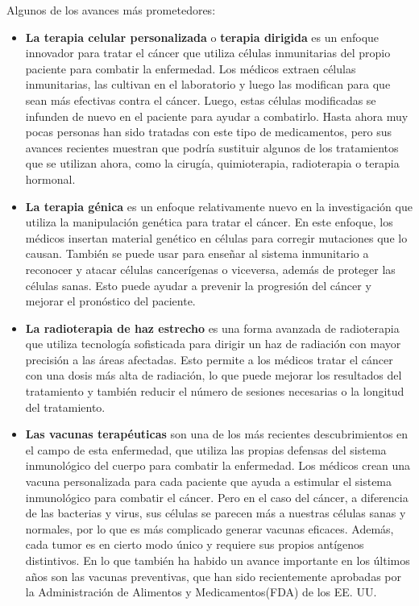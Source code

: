 Algunos de los avances más prometedores:
\begin{itemize}
    \item \textbf{La terapia celular personalizada} o \textbf{terapia dirigida} es un enfoque innovador para tratar el cáncer que utiliza células inmunitarias del propio paciente para combatir la enfermedad. Los médicos extraen células inmunitarias, las cultivan en el laboratorio y luego las modifican para que sean más efectivas contra el cáncer. Luego, estas células modificadas se infunden de nuevo en el paciente para ayudar a combatirlo. Hasta ahora muy pocas personas han sido tratadas con este tipo de medicamentos, pero sus avances recientes muestran que podría sustituir algunos de los tratamientos que se utilizan ahora, como la cirugía, quimioterapia, radioterapia o terapia hormonal.
    \item \textbf{La terapia génica} es un enfoque relativamente nuevo en la investigación que utiliza la manipulación genética para tratar el cáncer. En este enfoque, los médicos insertan material genético en células para corregir mutaciones que lo causan. También se puede usar para enseñar al sistema inmunitario a reconocer y atacar células cancerígenas o viceversa, adem\'as de proteger las células sanas. Esto puede ayudar a prevenir la progresión del cáncer y mejorar el pronóstico del paciente.
    \item \textbf{La radioterapia de haz estrecho} es una forma avanzada de radioterapia que utiliza tecnología sofisticada para dirigir un haz de radiación con mayor precisión a las áreas afectadas. Esto permite a los médicos tratar el cáncer con una dosis más alta de radiación, lo que puede mejorar los resultados del tratamiento y también reducir el número de sesiones necesarias o la longitud del tratamiento.
    \item \textbf{Las vacunas terapéuticas} son una de los más recientes descubrimientos en el campo de esta enfermedad, que utiliza las propias defensas del sistema inmunológico del cuerpo para combatir la enfermedad. Los médicos crean una vacuna personalizada para cada paciente que ayuda a estimular el sistema inmunológico para combatir el cáncer. Pero en el caso del cáncer, a diferencia de las bacterias y virus, sus células se parecen más a nuestras células sanas y normales, por lo que es más complicado generar vacunas eficaces. Además, cada tumor es en cierto modo único y requiere sus propios antígenos distintivos. En lo que también ha habido un avance importante en los últimos años son las vacunas preventivas, que han sido recientemente aprobadas por la Administración de Alimentos y Medicamentos(FDA) de los EE. UU.
\end{itemize}

